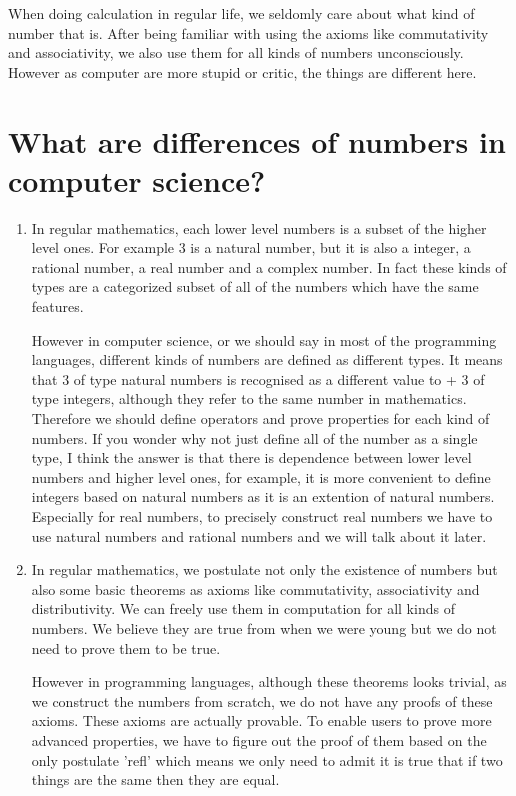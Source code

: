 \documentclass{article}
\theoremstyle{definition}
\begin{document}
When doing calculation in regular life, we seldomly care about what kind of number that is. After being familiar with using the axioms like commutativity and associativity, we also use them for all kinds of numbers unconsciously. However as computer are more stupid or critic, the things are different here.

\section{What are differences of numbers in computer science?}
\begin{enumerate}
\item In regular mathematics, each lower level numbers is a subset of the higher level ones. For example 3 is a natural number, but it is also a integer, a rational number, a real number and a complex number. In fact these kinds of types are a categorized subset of all of the numbers which have the same features.

However in computer science, or we should say in most of the programming languages, different kinds of numbers are defined as different types. It means that 3 of type natural numbers is recognised as a different value to + 3 of type integers, although they refer to the same number in mathematics. Therefore we should define operators and prove properties for each kind of numbers. If you wonder why not just define all of the number as a single type, I think the answer is that there is dependence between lower level numbers and higher level ones, for example, it is more convenient to define integers based on natural numbers as it is an extention of natural numbers.
Especially for real numbers, to precisely construct real numbers we have to use natural numbers and rational numbers and we will talk about it later.

\item In regular mathematics, we postulate not only the existence of numbers but also some basic theorems as axioms like commutativity, associativity and distributivity. We can freely use them in computation for all kinds of numbers. We believe they are true from when we were young but we do not need to prove them to be true.

However in programming languages, although these theorems looks trivial, as we construct the numbers from scratch, we do not have any proofs of these axioms. These axioms are actually provable. To enable users to prove more advanced properties, we have to figure out the proof of them based on the only postulate ’refl’ which means we only need to admit it is true that if two things are the same then they are equal.


\end{enumerate}
\end{document}
